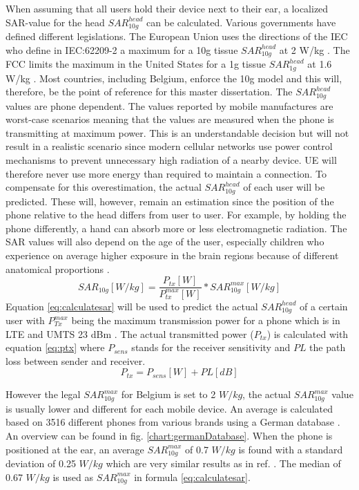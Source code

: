 When assuming that all users hold their device next to their ear, a localized SAR-value for the head $SAR^{head}_{10g}$ can be calculated.
Various governments have defined different legislations.
The European Union uses the directions of the  \acs{IEC} who
 define in IEC:62209-2 a maximum for a 10g tissue $SAR^{head}_{10g}$ at 2 W/kg \cite{J23}.
The \acs{FCC} limits the maximum in the United States for a 1g tissue $SAR^{head}_{1g}$ at 1.6 W/kg \cite{S15_SARFCC}.
Most countries, including Belgium, enforce the 10g model and this will, therefore, be the point of reference for this master dissertation.
The $SAR^{head}_{10g}$ values are phone dependent. The values reported by mobile manufactures are worst-case scenarios meaning that the 
values are measured when the phone is transmitting at maximum power. This is an understandable decision but will not result in a realistic scenario since 
modern cellular networks use power control mechanisms to prevent unnecessary high radiation of a nearby device. \gls{UE} will therefore never use more energy than 
required to maintain a connection.
To compensate for this overestimation, the actual $SAR^{head}_{10g}$ of each user will be predicted. These will, however, remain an estimation since the 
position of the phone relative to the head differs from user to user. For example, by holding the phone differently, a hand can absorb more or less 
electromagnetic radiation. The \gls{SAR} values will also depend on the age of the user, especially children who experience on average higher exposure in 
the brain regions because of different anatomical proportions \cite{J26_SARtissueage, J10_RDP}.
\begin{equation}
{SAR}_{10g}[W/kg] = \frac{P_{tx} [W]}{P^{max}_{tx} [W]} * {SAR}^{max}_{10g} [W/kg]
\label{eq:calculatesar}
\end{equation}
Equation \ref{eq:calculatesar} will be used to predict the actual $SAR^{head}_{10g}$  of a certain user with 
$P^{max}_{Tx}$ being the maximum transmission power for a phone which is in \gls{LTE} and UMTS 23 dBm \cite{J11_maxTpxUE, J10_RDP}.
The actual transmitted power ($P_{tx}$) is calculated with equation \ref{eq:ptx} where $P_{sens}$
stands for the receiver sensitivity and $PL$ the path loss between sender and receiver.
\begin{equation}
P_{tx} = P_{sens} [W] + PL [dB]
\label{eq:ptx}
\end{equation}
 
However the legal $SAR^{max}_{10g}$ for Belgium is set to 2 $W/kg$,  the actual  $SAR^{max}_{10g}$ value is usually lower and different for each mobile device. 
An average is calculated based on 3516 different phones from various brands using a German database \cite{SARDatabase}. An overview can be 
found in fig. \ref{chart:germanDatabase}.
When the phone is positioned at the ear, an average $SAR^{max}_{10g}$  of 0.7 $W/kg$ is found with a standard deviation of 0.25 $W/kg$ which are very similar 
results as in ref. \cite{j10.1.1}. The median of 0.67  $W/kg$ is used as $SAR^{max}_{10g}$ in formula \ref{eq:calculatesar}.


